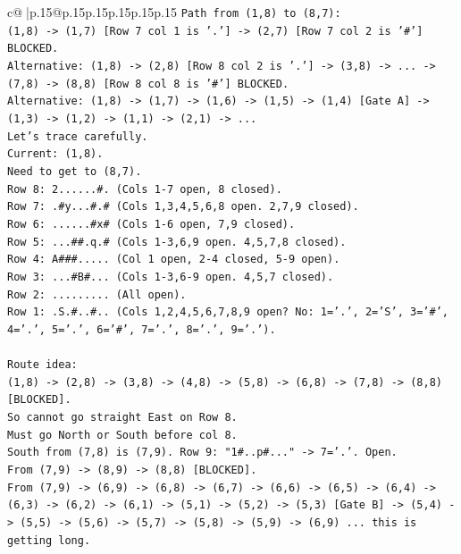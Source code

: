 \documentclass{article}
\begin{document}
{\begin{supertabular}{c@{$\;$}|p{.15\linewidth}@{}p{.15\linewidth}p{.15\linewidth}p{.15\linewidth}p{.15\linewidth}p{.15\linewidth}}
{{{\texttt{Path from (1,8) to (8,7):} \\
\texttt{(1,8) {-}> (1,7) {[}Row 7 col 1 is '.'{]} {-}> (2,7) {[}Row 7 col 2 is '\#'{]} BLOCKED.} \\
\texttt{Alternative: (1,8) {-}> (2,8) {[}Row 8 col 2 is '.'{]} {-}> (3,8) {-}> ... {-}> (7,8) {-}> (8,8) {[}Row 8 col 8 is '\#'{]} BLOCKED.} \\
\texttt{Alternative: (1,8) {-}> (1,7) {-}> (1,6) {-}> (1,5) {-}> (1,4) {[}Gate A{]} {-}> (1,3) {-}> (1,2) {-}> (1,1) {-}> (2,1) {-}> ...} \\
\texttt{Let's trace carefully.} \\
\texttt{Current: (1,8).} \\
\texttt{Need to get to (8,7).} \\
\texttt{Row 8: 2......\#. (Cols 1{-}7 open, 8 closed).} \\
\texttt{Row 7: .\#y...\#.\# (Cols 1,3,4,5,6,8 open. 2,7,9 closed).} \\
\texttt{Row 6: ......\#x\# (Cols 1{-}6 open, 7,9 closed).} \\
\texttt{Row 5: ...\#\#.q.\# (Cols 1{-}3,6,9 open. 4,5,7,8 closed).} \\
\texttt{Row 4: A\#\#\#..... (Col 1 open, 2{-}4 closed, 5{-}9 open).} \\
\texttt{Row 3: ...\#B\#... (Cols 1{-}3,6{-}9 open. 4,5,7 closed).} \\
\texttt{Row 2: ......... (All open).} \\
\texttt{Row 1: .S.\#..\#.. (Cols 1,2,4,5,6,7,8,9 open? No: 1='.', 2='S', 3='\#', 4='.', 5='.', 6='\#', 7='.', 8='.', 9='.').} \\
\\ 
\texttt{Route idea:} \\
\texttt{(1,8) {-}> (2,8) {-}> (3,8) {-}> (4,8) {-}> (5,8) {-}> (6,8) {-}> (7,8) {-}> (8,8) {[}BLOCKED{]}.} \\
\texttt{So cannot go straight East on Row 8.} \\
\texttt{Must go North or South before col 8.} \\
\texttt{South from (7,8) is (7,9). Row 9: "1\#..p\#..." {-}> 7='.'. Open.} \\
\texttt{From (7,9) {-}> (8,9) {-}> (8,8) {[}BLOCKED{]}.} \\
\texttt{From (7,9) {-}> (6,9) {-}> (6,8) {-}> (6,7) {-}> (6,6) {-}> (6,5) {-}> (6,4) {-}> (6,3) {-}> (6,2) {-}> (6,1) {-}> (5,1) {-}> (5,2) {-}> (5,3) {[}Gate B{]} {-}> (5,4) {-}> (5,5) {-}> (5,6) {-}> (5,7) {-}> (5,8) {-}> (5,9) {-}> (6,9) ... this is getting long.} \\
}}}
\end{supertabular}}
\end{document}
